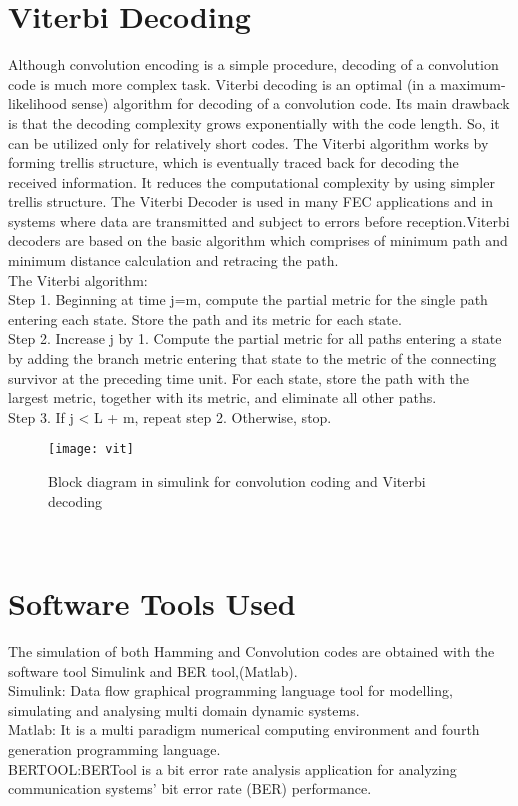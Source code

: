 \documentclass[conference]{IEEEtran}
\begin{document}
\section{Viterbi Decoding}
Although convolution encoding is a simple procedure, decoding of a convolution code is much more complex task. Viterbi decoding is an optimal (in a maximum-likelihood sense) algorithm for decoding of a convolution code. Its main drawback is that the decoding complexity grows exponentially with the code length. So, it can be utilized only for relatively short codes. The Viterbi algorithm works by forming trellis structure, which is eventually traced back for decoding the received information. It reduces the computational complexity by using simpler trellis structure. The Viterbi Decoder is used in many FEC applications and in systems where data are transmitted and subject to errors before reception.Viterbi decoders are based on the basic algorithm which comprises of minimum path and minimum distance calculation and retracing the path.\\
The Viterbi algorithm:\\
Step 1. Beginning at time j=m, compute the partial metric for the single path entering each state. Store the path and its metric for each state.\\                                                                                                                             
Step 2. Increase j by 1. Compute the partial metric for all paths entering a state by adding the branch metric entering that state to the metric of the connecting survivor at the preceding time unit. For each state, store the path with the largest metric, together with its metric, and eliminate all other paths.\\                                                                                                                            
Step 3. If j < L + m, repeat step 2. Otherwise, stop.\\ 
\begin{figure}[h]
\texttt{[image: vit]}
\caption{ Block diagram in simulink for convolution coding and Viterbi decoding}
\label{fig:vit}
\end{figure}\\
\section{Software Tools Used}
The simulation of both Hamming and Convolution codes are obtained with the software tool Simulink and BER tool,(Matlab).
\\Simulink: Data flow graphical programming language tool for modelling, simulating and analysing multi domain dynamic systems. 
\\Matlab: It is a multi paradigm numerical computing environment and fourth generation programming language.
\\BERTOOL:BERTool is a bit error rate analysis application for analyzing communication systems' bit error rate (BER) performance.
\end{document}
